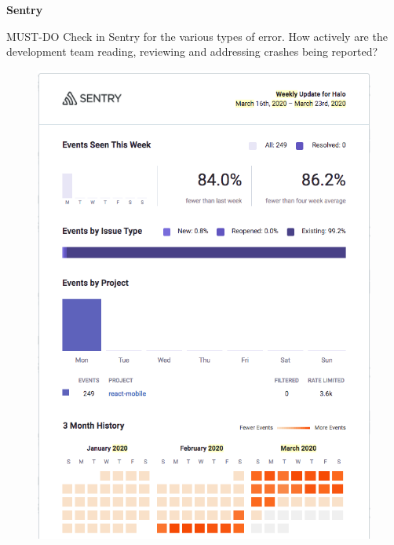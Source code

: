 \textbf{Sentry}

MUST-DO Check in Sentry for the various types of error. How actively are the development team reading, reviewing and addressing crashes being reported? 

\begin{figure}[htbp!]
\centering
\begin{minipage}{.5\textwidth}
  \centering
  \includegraphics[width=.8\linewidth]{images/localhalo/sentry-weekly-report-16-mar-2020.png}
  \label{fig:localhalo-sentry-weekly-report-16-mar-2020}
\end{minipage}%
\begin{minipage}{.5\textwidth}
  \centering

\end{minipage}
\end{figure}
